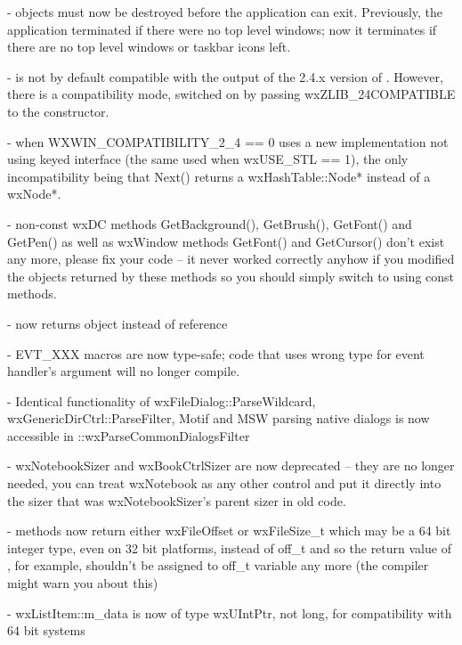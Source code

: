 -  objects must now be destroyed before the application can exit.
  Previously, the application terminated if there were no top level windows;
  now it terminates if there are no top level windows or taskbar icons left.

-  is not by default compatible with the output of the
  2.4.x version of . However, there is a compatibility mode,
  switched on by passing wxZLIB\_24COMPATIBLE to the constructor.

- when WXWIN\_COMPATIBILITY\_2\_4 == 0  uses a new implementation
  not using  keyed interface (the same used when wxUSE\_STL == 1),
  the only incompatibility being that Next() returns a wxHashTable::Node*
  instead of a wxNode*.

- non-const wxDC methods GetBackground(), GetBrush(), GetFont() and GetPen()
  as well as wxWindow methods GetFont() and GetCursor() don't exist any more,
  please fix your code -- it never worked correctly anyhow if you modified the
  objects returned by these methods so you should simply switch to using const
  methods.

-  now returns  object instead of reference

- EVT\_XXX macros are now type-safe; code that uses wrong type for event
  handler's argument will no longer compile.

- Identical functionality of wxFileDialog::ParseWildcard,
  wxGenericDirCtrl::ParseFilter, Motif and MSW parsing native dialogs
  is now accessible in ::wxParseCommonDialogsFilter

- wxNotebookSizer and wxBookCtrlSizer are now deprecated -- they are no longer
  needed, you can treat wxNotebook as any other control and put it directly
  into the sizer that was wxNotebookSizer's parent sizer in old code.

-  methods now return either wxFileOffset or wxFileSize\_t which may be a
  64 bit integer type, even on 32 bit platforms, instead of off\_t and so the
  return value of , for example, shouldn't be assigned to off\_t
  variable any more (the compiler might warn you about this)

- wxListItem::m\_data is now of type wxUIntPtr, not long, for compatibility
  with 64 bit systems

